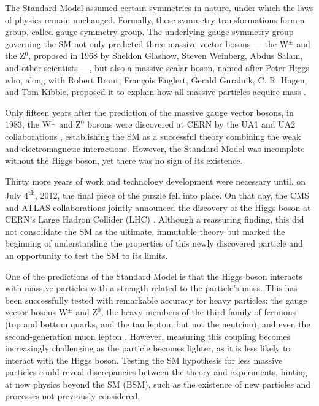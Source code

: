The Standard Model assumed certain symmetries in nature, under which the laws of physics remain unchanged. Formally, these symmetry transformations form a group, called gauge symmetry group. The underlying gauge symmetry group governing the SM not only predicted three massive vector bosons --- the W$^\pm$ and the Z$^0$, proposed in 1968 by Sheldon Glashow, Steven Weinberg, Abdus Salam, and other scientists \cite{Glashow:1961tr, Salam:1964ry, Weinberg:1967tq} ---, but also a massive scalar boson, named after Peter Higgs who, along with Robert Brout, François Englert, Gerald Guralnik, C. R. Hagen, and Tom Kibble, proposed it to explain how all massive particles acquire mass \cite{Higgs:1964pj, Englert:1964et, Guralnik:1964eu}.

Only fifteen years after the prediction of the massive gauge vector bosons, in 1983, the W$^\pm$ and Z$^0$ bosons were discovered at CERN by the UA1 and UA2 collaborations \cite{UA1:1983crd, UA2:1983tsx}, establishing the SM as a successful theory combining the weak and electromagnetic interactions. However, the Standard Model was incomplete without the Higgs boson, yet there was no sign of its existence.

Thirty more years of work and technology development were necessary until, on July 4\textsuperscript{th}, 2012, the final piece of the puzzle fell into place. On that day, the CMS and ATLAS collaborations jointly announced the discovery of the Higgs boson at CERN's Large Hadron Collider (LHC) \cite{CMS:2012qbp, ATLAS:2012yve}. Although a reassuring finding, this did not consolidate the SM as the ultimate, immutable theory but marked the beginning of understanding the properties of this newly discovered particle and an opportunity to test the SM to its limits.

One of the predictions of the Standard Model is that the Higgs boson interacts with massive particles with a strength related to the particle's mass. This has been successfully tested with remarkable accuracy for heavy particles: the gauge vector bosons W$^\pm$ and Z$^0$, the heavy members of the third family of fermions (top and bottom quarks, and the tau lepton, but not the neutrino), and even the second-generation muon lepton \cite{CMS:2022dwd}. However, measuring this coupling becomes increasingly challenging as the particle becomes lighter, as it is less likely to interact with the Higgs boson. Testing the SM hypothesis for less massive particles could reveal discrepancies between the theory and experiments, hinting at new physics beyond the SM (BSM), such as the existence of new particles and processes not previously considered.

